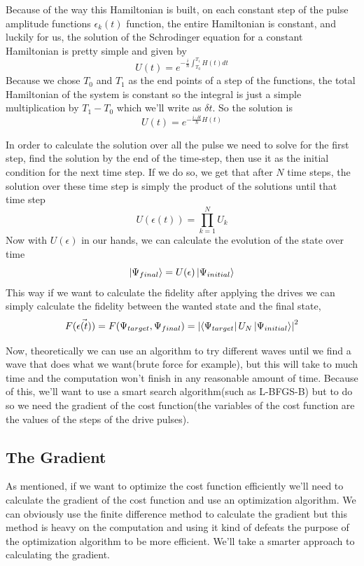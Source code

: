 \documentclass[english, a4paper, 12pt, twoside]{article}
\numberwithin{equation}{section} %
\begin{document}
Because of the way this Hamiltonian is built, on each constant step of the pulse amplitude functions $\epsilon_k(t)$ function, the entire Hamiltonian is constant, and luckily for us, the solution of the Schrodinger equation for a constant Hamiltonian is pretty simple and given by
\begin{equation}
U(t) = e^{-\frac{i}{\hbar}\int_{T_0}^{T_1}H(t)dt}
\end{equation}
Because we chose $T_0$ and $T_1$ as the end points of a step of the functions, the total Hamiltonian of the system is constant so the integral is just a simple multiplication by $T_1-T_0$ which we'll write as $\delta t$. So the solution is
\begin{equation}
U(t) = e^{-\frac{i\cdot \delta t}{\hbar}H(t)}
\end{equation}

In order to calculate the solution over all the pulse we need to solve for the first step, find the solution by the end of the time-step, then use it as the initial condition for the next time step. If we do so, we get that after $N$ time steps, the solution over these time step is simply the product of the solutions until that time step
\begin{equation}\label{eq:U_def_prod}
U(\epsilon(t)) = \prod_{k = 1}^NU_k
\end{equation}
Now with $U(\epsilon)$ in our hands, we can calculate the evolution of the state over time
\begin{equation}
\ket{\Psi_{final}} = U(\epsilon)\ket{\Psi_{initial}}
\end{equation}
This way if we want to calculate the fidelity after applying the drives we can simply calculate the fidelity between the wanted state and the final state,
\begin{equation} \label{eq:fidelity_sim}
F(\Vec{\epsilon(t)}) = F(\Psi_{target}, \Psi_{final}) = \abs{\bra{\Psi_{target}}U_N\ket{\Psi_{initial}}}^2
\end{equation}

Now, theoretically we can use an algorithm to try different waves until we find a wave that does what we want(brute force for example), but this will take to much time and the computation won't finish in any reasonable amount of time. Because of this, we'll want to use a smart search algorithm(such as L-BFGS-B) but to do so we need the gradient of the cost function(the variables of the cost function are the values of the steps of the drive pulses).

\subsection{The Gradient}
As mentioned, if we want to optimize the cost function efficiently we'll need to calculate the gradient of the cost function and use an optimization algorithm. We can obviously use the finite difference method to calculate the gradient but this method is heavy on the computation and using it kind of defeats the purpose of the optimization algorithm to be more efficient. We'll take a smarter approach to calculating the gradient.
\end{document}
